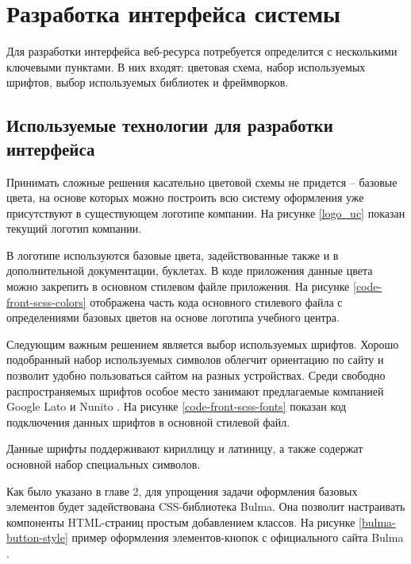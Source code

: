 \section{Разработка интерфейса системы}

Для разработки интерфейса веб-ресурса потребуется определится с несколькими ключевыми пунктами.
В них входят: цветовая схема, набор используемых шрифтов, выбор используемых библиотек и фреймворков.

\subsection{Используемые технологии для разработки интерфейса}

Принимать сложные решения касательно цветовой схемы не придется -- базовые цвета, на основе которых можно построить всю систему оформления уже присутствуют в существующем логотипе компании.
На рисунке \ref{logo_uc} показан текущий логотип компании.


В логотипе используются базовые цвета, задействованные также и в дополнительной документации, буклетах.
В коде приложения данные цвета можно закрепить в основном стилевом файле приложения.
На рисунке \ref{code-front-scss-colors} отображена часть кода основного стилевого файла с определениями базовых цветов на основе логотипа учебного центра.


Следующим важным решением является выбор используемых шрифтов.
Хорошо подобранный набор используемых символов облегчит ориентацию по сайту и позволит удобно пользоваться сайтом на разных устройствах.
Среди свободно распространяемых шрифтов особое место занимают предлагаемые компанией Google Lato \cite{google-lato} и Nunito \cite{google-nunito}.
На рисунке \ref{code-front-scss-fonts} показан код подключения данных шрифтов в основной стилевой файл.


Данные шрифты поддерживают кириллицу и латиницу, а также содержат основной набор специальных символов.

Как было указано в главе 2, для упрощения задачи оформления базовых элементов будет задействована CSS-библиотека Bulma.
Она позволит настраивать компоненты HTML-страниц простым добавлением классов.
На рисунке \ref{bulma-button-style} пример оформления элементов-кнопок с официального сайта Bulma \cite{bulma}.

